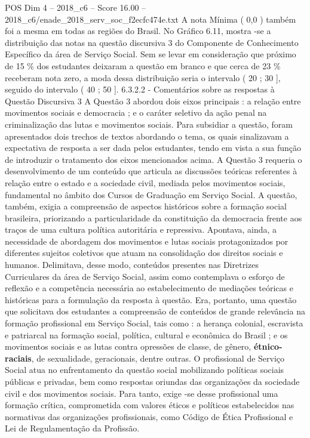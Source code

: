 \begin{textsample}{POS Dim 4 – 2018\_c6 – Score 16.00 – 2018\_c6/enade\_2018\_serv\_soc\_f2ecfc474e.txt}
A nota Mínima ( 0,0 ) também foi a mesma em todas as regiões do Brasil.
No Gráfico 6.11, mostra -se a distribuição das notas na questão discursiva 3 do Componente de Conhecimento Específico da área de Serviço Social.
Sem se levar em consideração que próximo de 15 \% dos estudantes deixaram a questão em branco e que cerca de 23 \% receberam nota zero, a moda dessa distribuição seria o intervalo ( 20 ; 30 ], seguido do intervalo ( 40 ; 50 ]. 6.3.2.2 - Comentários sobre as respostas à Questão Discursiva 3 A Questão 3 abordou dois eixos principais : a relação entre movimentos sociais e democracia ; e o caráter seletivo da ação penal na criminalização das lutas e movimentos sociais.
Para subsidiar a questão, foram apresentados dois trechos de textos abordando o tema, os quais sinalizavam a expectativa de resposta a ser dada pelos estudantes, tendo em vista a sua função de introduzir o tratamento dos eixos mencionados acima.
A Questão 3 requeria o desenvolvimento de um conteúdo que articula as discussões teóricas referentes à relação entre o estado e a sociedade civil, mediada pelos movimentos sociais, fundamental no âmbito dos Cursos de Graduação em Serviço Social.
A questão, também, exigia a compreensão de aspectos históricos sobre a formação social brasileira, priorizando a particularidade da constituição da democracia frente aos traços de uma cultura política autoritária e repressiva.
Apontava, ainda, a necessidade de abordagem dos movimentos e lutas sociais protagonizados por diferentes sujeitos coletivos que atuam na consolidação dos direitos sociais e humanos.
Delimitava, desse modo, conteúdos presentes nas Diretrizes Curriculares da área de Serviço Social, assim como contemplava o esforço de reflexão e a competência necessária ao estabelecimento de mediações teóricas e históricas para a formulação da resposta à questão.
Era, portanto, uma questão que solicitava dos estudantes a compreensão de conteúdos de grande relevância na formação profissional em Serviço Social, tais como : a herança colonial, escravista e patriarcal na formação social, política, cultural e econômica do Brasil ; e os movimentos sociais e as lutas contra opressões de classe, de gênero, \textbf{étnico-raciais}, de sexualidade, geracionais, dentre outras.
O profissional de Serviço Social atua no enfrentamento da questão social mobilizando políticas sociais públicas e privadas, bem como respostas oriundas das organizações da sociedade civil e dos movimentos sociais.
Para tanto, exige -se desse profissional uma formação crítica, comprometida com valores éticos e políticos estabelecidos nas normativas das organizações profissionais, como Código de Ética Profissional e Lei de Regulamentação da Profissão.

\end{textsample}
